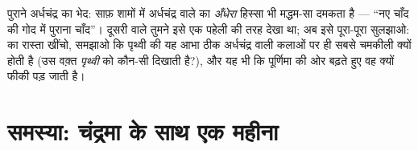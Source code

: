 \begin{exercise}[$\star\star\star$]\label{exo:g7:moon-phases:12}
पुराने अर्धचंद्र का भेद: साफ़ शामों में अर्धचंद्र वाले  का
\emph{अँधेरा} हिस्सा भी मद्धम-सा दमकता है --- ``नए चाँद की गोद में
पुराना चाँद''। दूसरी  वाले तुमने इसे एक पहेली की तरह देखा था; अब
इसे पूरा-पूरा सुलझाओ:  का रास्ता खींचो, समझाओ कि पृथ्वी की यह
आभा ठीक अर्धचंद्र वाली कलाओं पर ही सबसे चमकीली क्यों होती है (उस वक़्त
\emph{पृथ्वी}  को कौन-सी  दिखाती है?), और यह भी कि पूर्णिमा
की ओर बढ़ते हुए वह क्यों फीकी पड़ जाती है।
\end{exercise}

\section{समस्या: चंद्रमा के साथ एक महीना}

